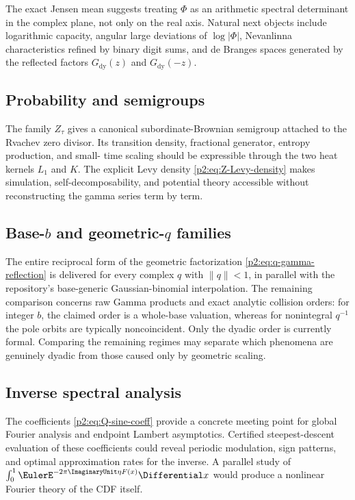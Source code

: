 \documentclass[11pt]{article}
\theoremstyle{definition}
\theoremstyle{remark}
\begin{document}
The exact Jensen mean suggests treating $\Phi$ as an arithmetic spectral determinant in the
complex plane, not only on the real axis.  Natural next objects include logarithmic capacity,
angular large deviations of $\log|\Phi|$, Nevanlinna characteristics refined by binary digit
sums, and de Branges spaces generated by the reflected factors
$G_{\mathrm{dy}}(z)$ and $G_{\mathrm{dy}}(-z)$.

\subsection{Probability and semigroups}

The family $Z_\tau$ gives a canonical subordinate-Brownian semigroup attached to the Rvachev
zero divisor.  Its transition density, fractional generator, entropy production, and small-
time scaling should be expressible through the two heat kernels $L_1$ and $K$.  The explicit
Levy density \eqref{p2:eq:Z-Levy-density} makes simulation, self-decomposability, and potential
theory accessible without reconstructing the gamma series term by term.

\subsection{Base-\texorpdfstring{$b$}{b} and geometric-\texorpdfstring{$q$}{q} families}

The entire reciprocal form of the geometric factorization
\eqref{p2:eq:q-gamma-reflection} is delivered for every complex \(q\) with
\(\lVert q\rVert<1\), in parallel with the repository's base-generic Gaussian-binomial
interpolation.  The remaining comparison concerns raw Gamma products and exact analytic
collision orders: for integer \(b\), the claimed order is a whole-base valuation, whereas for
nonintegral \(q^{-1}\) the pole orbits are typically noncoincident.  Only the dyadic order is
currently formal.  Comparing the remaining regimes may separate which phenomena are
genuinely dyadic from those caused only by geometric scaling.

\subsection{Inverse spectral analysis}

The coefficients \eqref{p2:eq:Q-sine-coeff} provide a concrete meeting point for global Fourier
analysis and endpoint Lambert asymptotics.  Certified steepest-descent evaluation of these
coefficients could reveal periodic modulation, sign patterns, and optimal approximation
rates for the inverse.  A parallel study of
\(
 \int_0^1\EulerE^{-2\pi\ImaginaryUnit\eta F(x)}\Differential x
\)
would produce a nonlinear Fourier theory of the CDF itself.
\end{document}

